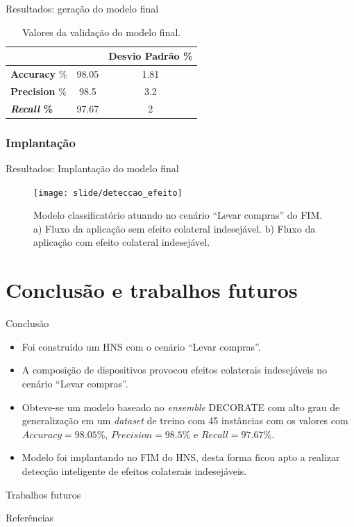 \documentclass[brazil]{beamer}
\begin{document}
\begin{frame}{Resultados: geração do modelo final}
\begin{table}[!htp]
  \centering
  \begin{tabular}{ |l|c|c|}
    \hline
       {\bf } & {\bf } & {\bf Desvio Padrão \%} \\
    \hline
       \textbf{Accuracy} \% & 98.05 & 1.81 \\
    \hline
       \textbf{Precision} \% & 98.5 & 3.2 \\
    \hline
       \textbf{\textit{Recall} \%} & 97.67 & 2 \\
    \hline
  \end{tabular}
  \caption{Valores da validação do modelo final.}
  \label{table:valmodelfinal}
\end{table}
\end{frame}


\subsubsection{Implantação}
\begin{frame}{Resultados: Implantação do modelo final}
   \begin{figure}[!htb] \centering 
     \centering
     \texttt{[image: slide/deteccao\_efeito]} 
     \caption{Modelo classificatório atuando no cenário ``Levar compras'' do FIM. a) Fluxo da aplicação sem efeito colateral indesejável. b) Fluxo da aplicação com efeito colateral indesejável.} 
     \label{fig:deteccao_efeito}
   \end{figure}
\end{frame}


\section{Conclusão e trabalhos futuros}
\begin{frame}{Conclusão}
   \begin{itemize}
      \item <1 ->Foi construído um HNS com o cenário ``Levar compras''.
      \item <2 ->A composição de dispositivos provocou efeitos colaterais indesejáveis no cenário ``Levar compras''.
      \item <3 ->Obteve-se um modelo baseado no \textit{ensemble} DECORATE com alto grau de generalização em um \textit{dataset} de treino com 45 instâncias com os valores com $\textit{Accuracy}=98.05\%$, $\textit{Precision}=98.5\%$ e $\textit{Recall}=97.67\%$. 
      \item <4 ->Modelo foi implantando no FIM do HNS, desta forma ficou apto a realizar detecção inteligente de efeitos colaterais indesejáveis.
   \end{itemize}
\end{frame}

\begin{frame}{Trabalhos futuros}

\end{frame}


\begin{frame}[allowframebreaks]{Referências}
  
\end{frame}
\end{document}
